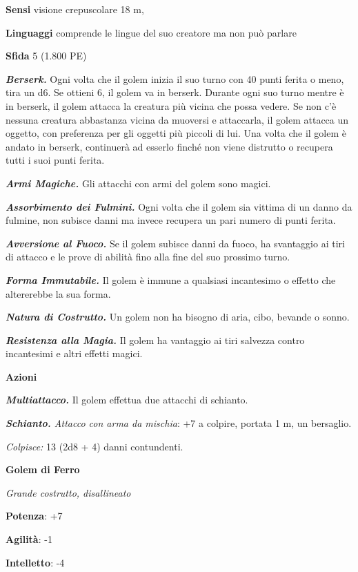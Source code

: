 \begin{multicols}{2}
\textbf{Sensi} visione crepuscolare 18 m, 

\textbf{Linguaggi} comprende le lingue del suo creatore ma non può
parlare

\textbf{Sfida} 5 (1.800 PE)\smallskip

\emph{\textbf{Berserk.}} Ogni volta che il golem inizia il suo turno con
40 punti ferita o meno, tira un d6. Se ottieni 6, il golem va in
berserk. Durante ogni suo turno mentre è in berserk, il golem attacca la
creatura più vicina che possa vedere. Se non c'è nessuna creatura
abbastanza vicina da muoversi e attaccarla, il golem attacca un oggetto,
con preferenza per gli oggetti più piccoli di lui. Una volta che il
golem è andato in berserk, continuerà ad esserlo finché non viene
distrutto o recupera tutti i suoi punti ferita.

\emph{\textbf{Armi Magiche.}} Gli attacchi con armi del golem sono
magici.

\emph{\textbf{Assorbimento dei Fulmini.}} Ogni volta che il golem sia
vittima di un danno da fulmine, non subisce danni ma invece recupera un
pari numero di punti ferita.

\emph{\textbf{Avversione al Fuoco.}} Se il golem subisce danni da fuoco,
ha svantaggio ai tiri di attacco e le prove di abilità fino alla fine
del suo prossimo turno.

\emph{\textbf{Forma Immutabile.}} Il golem è immune a qualsiasi
incantesimo o effetto che altererebbe la sua forma.

\emph{\textbf{Natura di Costrutto.}} Un golem non ha bisogno di aria,
cibo, bevande o sonno.

\emph{\textbf{Resistenza alla Magia.}} Il golem ha vantaggio ai tiri
salvezza contro incantesimi e altri effetti magici.

\smallskip\textbf{Azioni}

\emph{\textbf{Multiattacco.}} Il golem effettua due attacchi di
schianto.

\emph{\textbf{Schianto.} Attacco con arma da mischia}: +7 a colpire,
portata 1 m, un bersaglio.

\emph{Colpisce:} 13 (2d8 + 4) danni contundenti.



\textbf{Golem di Ferro}

\emph{Grande costrutto, disallineato}

\textbf{Potenza}: +7

\textbf{Agilità}: -1

\textbf{Intelletto}: -4


\end{multicols}
